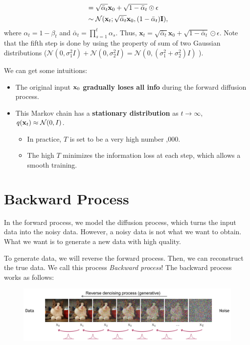 \begin{itemize}
\begin{align}
						   &= \sqrt{\bar{\alpha}_t} \mathbf{x}_{0}+ \sqrt{1-\bar{\alpha}_t} \odot \epsilon\\
	&\sim \mathcal{N}(\mathbf{x}_t; \sqrt{\bar{\alpha}_t} {\mathbf{x}}_{0}, (1-\bar{\alpha}_t)\mathbf{I}),
	\label{eq:diffusion_forward_sampling}
\end{align}
			where $\alpha_t = 1-\beta_t$ and $\bar{\alpha}_t = \prod_{s=1}^t \alpha_s$. Thus, $\mathbf{x}_t= \sqrt{\bar{\alpha}_t} \mathbf{x}_{0}+ \sqrt{1-\bar{\alpha}_t} \odot \epsilon$. Note that the fifth step is done by using the property of sum of two Gaussian distributions (\eg $\mathcal{N}(0, \sigma_1^2I)+\mathcal{N}(0, \sigma_2^2I) = \mathcal{N}(0, (\sigma_1^2+\sigma_2^2)I)$ ). 
\end{itemize}

We can get some intuitions:
\begin{itemize}
	\item The original input ${\mathbf{x}}_0$ \textbf{gradually loses all info} during the forward diffusion process.
	\item This Markov chain has a \textbf{stationary distribution} \ie as $t\to \infty$, $q({\mathbf{x}}_t) \approx \mathcal{N}(0,I)$.
		\begin{itemize}
			\item In practice, $T$ is set to be a very high number ,000.
			\item The high $T$ minimizes the information loss at each step, which allows a smooth training.
		\end{itemize}
\end{itemize}

\section{Backward Process}

In the forward process, we model the diffusion process, which turns the input data into the noisy data. However, a noisy data is not what we want to obtain. What we want is to generate a new data with high quality.

To generate data, we will reverse the forward process. Then, we can reconstruct the true data. We call this process \textit{Backward process}! The backward process works as follows:

\begin{figure}[t]
	\centering
	\includegraphics[scale=0.30]{./images/diffusion/reverse.png}
\end{figure}

